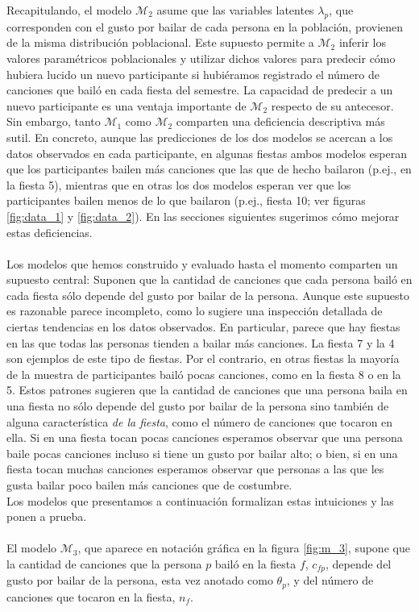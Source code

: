 \documentclass{article}
\begin{document}
\indent Recapitulando, el modelo $\mathcal M_2$ asume que las variables latentes $\lambda_p$, que corresponden con el gusto por bailar de cada persona en la población, provienen de la misma distribución poblacional. Este supuesto permite a $\mathcal M_2$ inferir los valores paramétricos poblacionales y utilizar dichos valores para predecir cómo hubiera lucido un nuevo participante si hubiéramos registrado el número de canciones que bailó en cada fiesta del semestre. La capacidad de predecir a un nuevo participante es una ventaja importante de $\mathcal M_2$ respecto de su antecesor.\\
\indent Sin embargo, tanto $\mathcal M_1$ como $\mathcal M_2$ comparten una deficiencia descriptiva más sutil. En concreto, aunque las predicciones de los dos modelos se acercan a los datos observados en cada participante, en algunas fiestas ambos modelos esperan que los participantes bailen más canciones que las que de hecho bailaron (p.ej., en la fiesta 5), mientras que en otras los dos modelos esperan ver que los participantes bailen menos de lo que bailaron (p.ej., fiesta 10; ver figuras \ref{fig:data_1} y \ref{fig:data_2}). En las secciones siguientes sugerimos cómo mejorar estas deficiencias.\\\\
\indent Los modelos que hemos construido y evaluado hasta el momento comparten un supuesto central: Suponen que la cantidad de canciones que cada persona bailó en cada fiesta sólo depende del gusto por bailar de la persona. Aunque este supuesto es razonable parece incompleto, como lo sugiere una inspección detallada de ciertas tendencias en los datos observados. En particular, parece que hay fiestas en las que todas las personas tienden a bailar más canciones. La fiesta 7 y la 4 son ejemplos de este tipo de fiestas. Por el contrario, en otras fiestas la mayoría de la muestra de participantes bailó pocas canciones, como en la fiesta 8 o en la 5. Estos patrones sugieren que la cantidad de canciones que una persona baila en una fiesta no sólo depende del gusto por bailar de la persona sino también de alguna característica \emph{de la fiesta}, como el número de canciones que tocaron en ella. Si en una fiesta tocan pocas canciones esperamos observar que una persona baile pocas canciones incluso si tiene un gusto por bailar alto; o bien, si en una fiesta tocan muchas canciones esperamos observar que personas a las que les gusta bailar poco bailen más canciones que de costumbre.\\
\indent Los modelos que presentamos a continuación formalizan estas intuiciones y las ponen a prueba.\\\\
\indent El modelo $\mathcal M_3$, que aparece en notación gráfica en la figura \ref{fig:m_3}, supone que la cantidad de canciones que la persona $p$ bailó en la fiesta $f$, $c_{fp}$, depende del gusto por bailar de la persona, esta vez anotado como $\theta_p$, y del número de canciones que tocaron en la fiesta, $n_f$.
\end{document}
